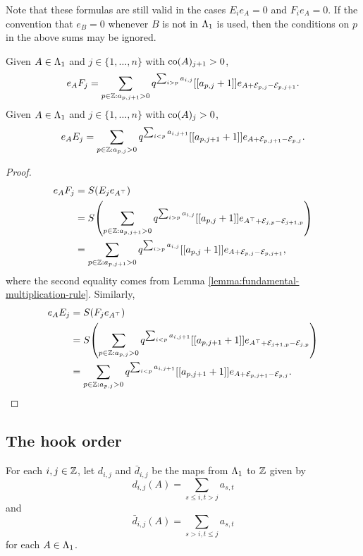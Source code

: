 \documentclass[a4paper, 11pt]{report}
\begin{document}
Note that these formulas are still valid in the cases $E_ie_A=0$ and $F_ie_A=0$. If the convention that $e_B = 0$ whenever $B$ is not in $\Lambda_1{}$ is used, then the conditions on $p$ in the above sums may be ignored.

\begin{corollary}\label{corollary:fundamental-right-multiplication-rules}
Given $A\in\Lambda_1{}$ and $j\in\{1,\ldots,n\}$ with $\operatorname{co}(A)_{j+1}>0$,
\begin{equation*}
e_AF_j = \sum_{p\in\mathbb{Z}: a_{p,j+1}>0} q^{\sum_{i>p}a_{i,j}} [[a_{p,j}+1]] e_{A+\mathcal{E}_{p,j}-\mathcal{E}_{p,j+1}}.
\end{equation*}
Given $A\in\Lambda_1{}$ and $j\in\{1,\ldots,n\}$ with $\operatorname{co}(A)_{j}>0$,
\begin{equation*}
e_AE_j = \sum_{p\in\mathbb{Z}: a_{p,j}>0} q^{\sum_{i<p} a_{i,j+1}} [[a_{p,j+1}+1]] e_{A+\mathcal{E}_{p,j+1}-\mathcal{E}_{p,j}}.
\end{equation*}
\end{corollary}

\begin{proof}
\begin{align*}
e_AF_j
&= S{\left(E_j e_{A^\top}\right)}\\
&= S{\left(\sum_{p\in\mathbb{Z}: a_{p,j+1}>0} q^{\sum_{i>p} a_{i,j}} [[a_{p,j}+1]] e_{A^\top +\mathcal{E}_{j,p} -\mathcal{E}_{j+1,p}}\right)}\\
&= \sum_{p\in\mathbb{Z}: a_{p,j+1}>0} q^{\sum_{i>p}a_{i,j}} [[a_{p,j}+1]] e_{A+\mathcal{E}_{p,j}-\mathcal{E}_{p,j+1}},
\end{align*}
where the second equality comes from Lemma \ref{lemma:fundamental-multiplication-rule}. Similarly,
\begin{align*}
e_AE_j
&= S{\left(F_j e_{A^\top}\right)}\\
&= S{\left( \sum_{p\in\mathbb{Z}:a_{p,j}>0} q^{\sum_{i<p} a_{i,j+1}} [[a_{p,j+1}+1]] e_{A^\top +\mathcal{E}_{j+1,p} - \mathcal{E}_{j,p}}\right)}\\
&= \sum_{p\in\mathbb{Z}: a_{p,j}>0} q^{\sum_{i<p}a_{i,j+1}} [[a_{p,j+1}+1]] e_{A+\mathcal{E}_{p,j+1} -\mathcal{E}_{p,j}}.
\end{align*}
\end{proof}


\subsection{The hook order}

For each $i,j\in\mathbb{Z}$, let $d_{i,j}$ and $\bar{d}_{i,j}$ be the maps from $\Lambda_1{}$ to $\mathbb{Z}$ given by
\begin{equation*}
d_{i,j}{(A)} = \sum_{s\le i,t>j} a_{s,t}
\end{equation*}
and
\begin{equation*}
\bar{d}_{i,j}{(A)} = \sum_{s>i, t\le j} a_{s,t}
\end{equation*}
for each $A\in\Lambda_1{}$.
\end{document}

